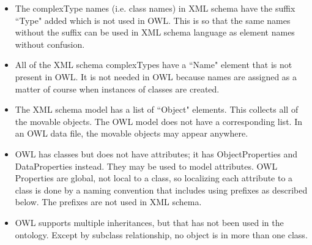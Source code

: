 \begin{itemize}
  \item The \textsf{complexType} names (i.e. class names) in XML schema have the suffix ``Type" added which is not used in OWL. This is so that the same names without the suffix can be used in XML schema language as element names without confusion.
  \item All of the XML schema \textsf{complexTypes} have a ``Name" element that is not present in OWL. It is not needed in OWL because names are assigned as a matter of course when instances of classes are created.
  \item The XML schema model has a list of ``Object" elements. This collects all of the movable objects. The OWL model does not have a corresponding list. In an OWL data file, the movable objects may appear anywhere.
  \item OWL has classes but does not have attributes; it has \textsf{ObjectProperties} and \textsf{DataProperties} instead. They may be used to model attributes. OWL Properties are global, not local to a class, so localizing each attribute to a class is done by a naming convention that includes using prefixes as described below. The prefixes are not used in XML schema.
  \item OWL supports multiple inheritances, but that has not been used in the  ontology. Except by subclass relationship, no object is in more than one class.
\end{itemize}

